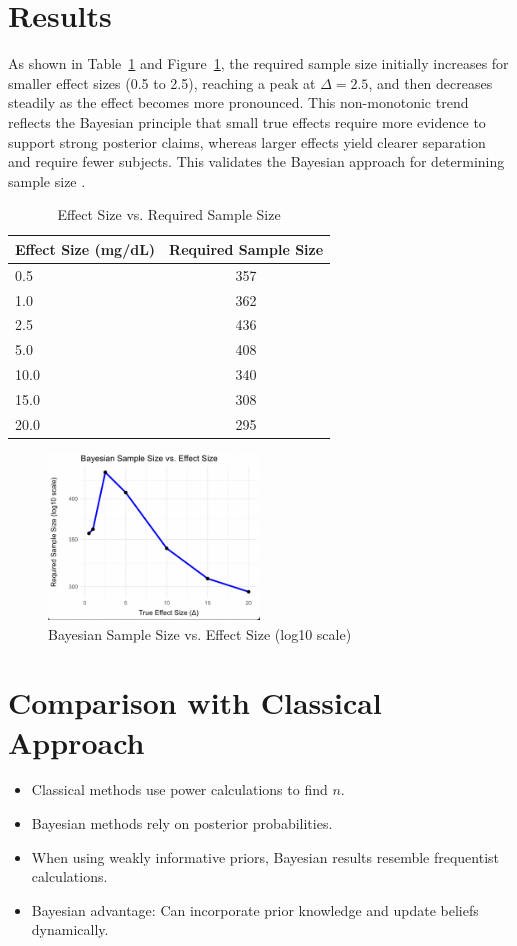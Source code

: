 \documentclass{article}
\begin{document}
	\section{Results}
	As shown in Table~\ref{tab:results} and Figure~\ref{fig:sample_size_plot}, the required sample size initially increases for smaller effect sizes (0.5 to 2.5), reaching a peak at $\Delta = 2.5$, and then decreases steadily as the effect becomes more pronounced. This non-monotonic trend reflects the Bayesian principle that small true effects require more evidence to support strong posterior claims, whereas larger effects yield clearer separation and require fewer subjects.
	This validates the Bayesian approach for determining sample size \cite{Lee2023}.
	
	
	\begin{table}[h]
		\centering
		\begin{tabular}{lc}
			\toprule
			\textbf{Effect Size (mg/dL)} & \textbf{Required Sample Size} \\
			\midrule
			0.5  & 357 \\
			1.0  & 362 \\
			2.5  & 436 \\
			5.0  & 408 \\
			10.0 & 340 \\
			15.0 & 308 \\
			20.0 & 295 \\
			\bottomrule
		\end{tabular}
		\caption{Effect Size vs. Required Sample Size}
		\label{tab:results}
	\end{table}
\begin{figure}[h]
    \centering
    \includegraphics[width=0.5\textwidth]{sample_size_plot.png}
    \caption{Bayesian Sample Size vs. Effect Size (log10 scale)}
    \label{fig:sample_size_plot}
\end{figure}

	

\section{Comparison with Classical Approach}
	\begin{itemize}
		\item Classical methods use power calculations to find $n$.
		\item Bayesian methods rely on posterior probabilities.
		\item When using weakly informative priors, Bayesian results resemble frequentist calculations.
		\item Bayesian advantage: Can incorporate prior knowledge and update beliefs dynamically.
	\end{itemize}
	
\end{document}
